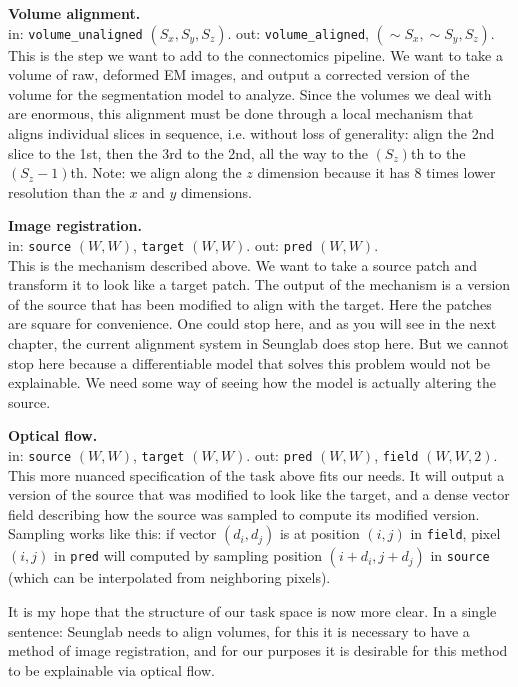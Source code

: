 \documentclass[12pt,a4paper]{article}
\begin{document}
{\bf Volume alignment.} \\
\indent in: {\tt volume\_unaligned}  $(S_x, S_y, S_z)$. 
out:  {\tt volume\_aligned}, $(\mathtt{\sim} S_x, \mathtt{\sim} S_y, S_z)$.\\
\indent This is the step we want to add to the connectomics pipeline. We want to take a volume of raw, deformed EM images, and output a corrected version of the volume for the segmentation model to analyze. Since the volumes we deal with are enormous, this alignment must be done through a local mechanism that aligns individual slices in sequence, i.e. without loss of generality: align the 2nd slice to the 1st, then the 3rd to the 2nd, all the way to the $(S_z)$th to the $(S_z-1)$th. Note: we align along the $z$ dimension because it has 8 times lower resolution than the $x$ and $y$ dimensions. 

{\bf Image registration.}\\
\indent in: {\tt source} $(W, W)$, {\tt target} $(W, W)$. 
out: {\tt pred} $(W, W)$.\\
\indent This is the mechanism described above. We want to take a source patch and transform it to look like a target patch. The output of the mechanism is a version of the source that has been modified to align with the target. Here the patches are square for convenience. One could stop here, and as you will see in the next chapter, the current alignment system in Seunglab does stop here. But we cannot stop here because a differentiable model that solves this problem would not be explainable. We need some way of seeing how the model is actually altering the source.

{\bf Optical flow.} \\
\indent in: {\tt source} $(W, W)$, {\tt target} $(W, W)$. 
out: {\tt pred} $(W, W)$, {\tt field} $(W, W, 2)$.\\
\indent This more nuanced specification of the task above fits our needs. It will output a version of the source that was modified to look like the target, and a dense vector field describing how the source was sampled to compute its modified version. Sampling works like this: if vector $(d_i, d_j)$ is at position $(i,j)$ in {\tt field}, pixel $(i,j)$ in {\tt pred} will computed by sampling position $(i+d_i,j+d_j)$ in {\tt source} (which can be interpolated from neighboring pixels).

It is my hope that the structure of our task space is now more clear. In a single sentence: Seunglab needs to align volumes, for this it is necessary to have a method of image registration, and for our purposes it is desirable for this method to be explainable via optical flow.
\end{document}
